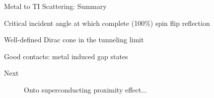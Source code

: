 \documentclass[]{beamer}
\begin{document}


\begin{frame}{Metal to TI Scattering: Summary}
\begin{list}{*}{}
\item Critical incident angle at which complete (100\%) spin flip reflection\\ 
\item Well-defined Dirac cone in the tunneling limit\\ 
\item Good contacts: metal induced gap states
\end{list}
\end{frame}


\begin{frame}{Next}
\begin{figure}
\Large Onto superconducting proximity effect...
\end{figure}
\end{frame}
\end{document}
